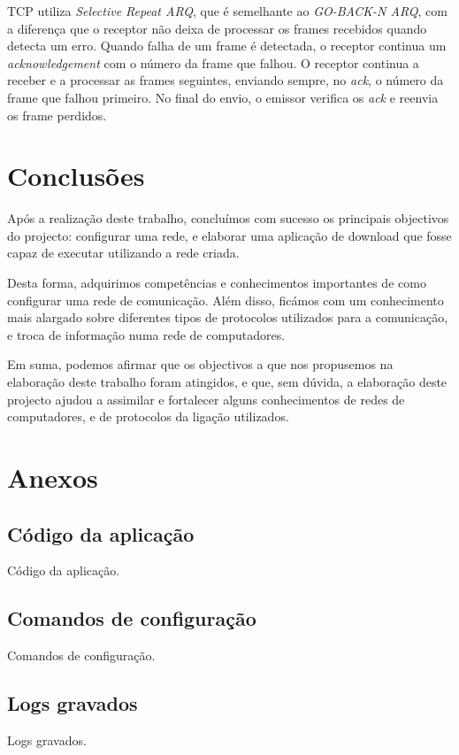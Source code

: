 \documentclass[a4paper]{article}
\begin{document}
TCP utiliza \textit{Selective Repeat ARQ}, que é semelhante ao \textit{GO-BACK-N ARQ}, com a diferença que o receptor não deixa de processar os frames recebidos quando detecta um erro. Quando falha de um frame é detectada, o receptor continua um \textit{acknowledgement} com o número da frame que falhou. O receptor continua a receber e a processar as frames seguintes, enviando sempre, no \textit{ack}, o número da frame que falhou primeiro. No final do envio, o emissor verifica os \textit{ack} e reenvia os frame perdidos.

\section{Conclusões}
Após a realização deste trabalho, concluímos com sucesso os principais objectivos do projecto: configurar uma rede, e elaborar uma aplicação de download que fosse capaz de executar utilizando a rede criada.

Desta forma, adquirimos competências e conhecimentos importantes de como configurar uma rede de comunicação. Além disso, ficámos com um conhecimento mais alargado sobre diferentes tipos de protocolos utilizados para a comunicação, e troca de informação numa rede de computadores.
 
Em suma, podemos afirmar que os objectivos a que nos propusemos na elaboração deste trabalho foram atingidos, e que, sem dúvida, a elaboração deste projecto ajudou a assimilar e fortalecer alguns conhecimentos de redes de computadores, e de protocolos da ligação utilizados.

\clearpage
{}
\renewcommand\refname{Referências}



\newpage
\appendix
\section{Anexos}

\subsection{Código da aplicação}
Código da aplicação.

\subsection{Comandos de configuração}
Comandos de configuração.

\subsection{Logs gravados}
Logs gravados.
\end{document}
